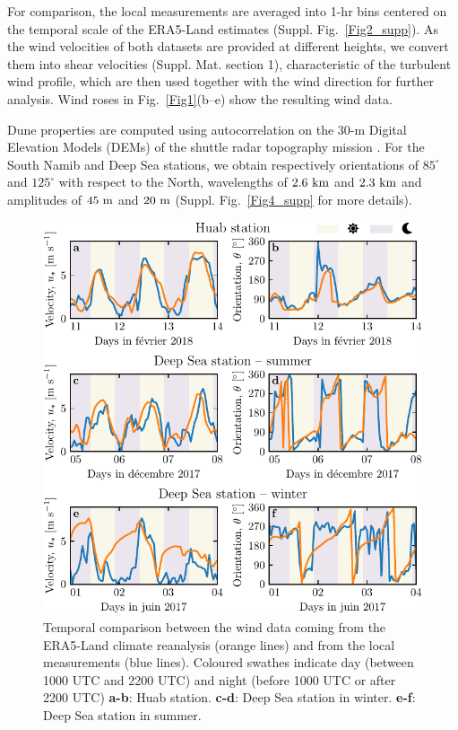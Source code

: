 For comparison, the local measurements are averaged into 1-hr bins centered on the temporal scale of the ERA5-Land estimates (Suppl. Fig.~\ref{Fig2_supp}). As the wind velocities of both datasets are provided at different heights, we convert them into shear velocities (Suppl. Mat. section 1), characteristic of the turbulent wind profile, which are then used together with the wind direction for further analysis. Wind roses in Fig.~\ref{Fig1}(b--e) show the resulting wind data.

Dune properties are computed using autocorrelation on the 30-m Digital Elevation Models (DEMs) of the shuttle radar topography mission \citep{Farr2007}. For the South Namib and Deep Sea stations, we obtain respectively orientations of $85^\circ$ and $125^\circ$ with respect to the North, wavelengths of $2.6~\textup{km}$ and $2.3~\textup{km}$ and amplitudes of $45~\textup{m}$ and $20~\textup{m}$ (Suppl. Fig.~\ref{Fig4_supp} for more details).


\begin{figure}
\centering
\includegraphics[scale=1]{Figures/Figure2.pdf}
\caption{Temporal comparison between the wind data coming from the ERA5-Land climate reanalysis (orange lines) and from the local measurements (blue lines). Coloured swathes indicate day (between 1000 UTC and 2200 UTC) and night (before 1000 UTC or after 2200 UTC) \textbf{a-b}: Huab station. \textbf{c-d}: Deep Sea station in winter. \textbf{e-f}: Deep Sea station in summer.}
\label{Fig2}
\end{figure}


